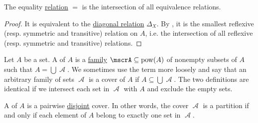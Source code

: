 \begin{proposition}\label{thm:equality_is_smallest_equivalence_relation}
  The equality \hyperref[def:binary_relation]{relation} \( = \) is the intersection of all equivalence relations.
\end{proposition}
\begin{proof}
  It is equivalent to the \hyperref[def:binary_relation/diagonal]{diagonal relation} \( \Delta_X \). By , it is the smallest reflexive (resp. symmetric and transitive) relation on \( A \), i.e. the intersection of all reflexive (resp. symmetric and transitive) relations.
\end{proof}

\begin{definition}\label{def:set_partition}
  Let \( A \) be a set. A  of \( A \) is a \hyperref[rem:family_of_sets]{family} \( \mscrA \subseteq \pow(A) \) of nonempty subsets of \( A \) such that \( A = \bigcup \mscrA \). We sometimes use the term more loosely and say that an arbitrary family of sets \( \mscrA \) is a cover of \( A \) if \( A \subseteq \bigcup \mscrA \). The two definitions are identical if we intersect each set in \( \mscrA \) with \( A \) and exclude the empty sets.

  A  of \( A \) is a pairwise \hyperref[def:subset]{disjoint} cover. In other words, the cover \( \mscrA \) is a partition if and only if each element of \( A \) belong to exactly one set in \( \mscrA \).
\end{definition}

